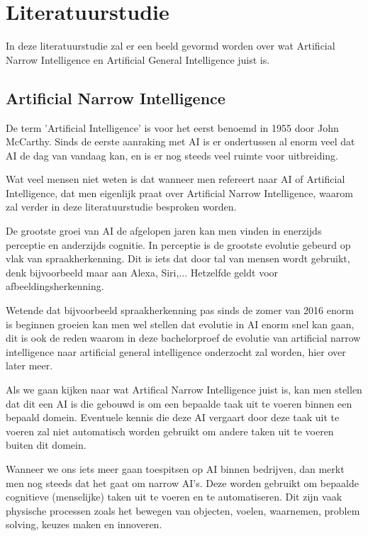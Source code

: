 \section{Literatuurstudie}
\label{sec:state-of-the-art}

In deze literatuurstudie zal er een beeld gevormd worden over wat Artificial Narrow Intelligence en Artificial General Intelligence juist is.

\subsection{Artificial Narrow Intelligence}

De term 'Artificial Intelligence' is voor het eerst benoemd in 1955 door John McCarthy. Sinds de eerste aanraking met AI is er ondertussen al enorm veel dat AI de dag van vandaag kan, en is er nog steeds veel ruimte voor uitbreiding.

Wat veel mensen niet weten is dat wanneer men refereert naar AI of Artificial Intelligence, dat men eigenlijk praat over Artificial Narrow Intelligence, waarom zal verder in deze literatuurstudie besproken worden. 

De grootste groei van AI de afgelopen jaren kan men vinden in enerzijds perceptie en anderzijds cognitie. In perceptie is de grootste evolutie gebeurd op vlak van spraakherkenning. Dit is iets dat door tal van mensen wordt gebruikt, denk bijvoorbeeld maar aan Alexa, Siri,... Hetzelfde geldt voor afbeeldingsherkenning.

Wetende dat bijvoorbeeld spraakherkenning pas sinds de zomer van 2016 enorm is beginnen groeien kan men wel stellen dat evolutie in AI enorm snel kan gaan, dit is ook de reden waarom in deze bachelorproef de evolutie van artificial narrow intelligence naar artificial general intelligence onderzocht zal worden, hier over later meer. \autocite{brynjolfsson2017artificial}

Als we gaan kijken naar wat Artifical Narrow Intelligence juist is, kan men stellen dat dit een AI is die gebouwd is om een bepaalde taak uit te voeren binnen een bepaald domein. Eventuele kennis die deze AI vergaart door deze taak uit te voeren zal niet automatisch worden gebruikt om andere taken uit te voeren buiten dit domein. 

Wanneer we ons iets meer gaan toespitsen op AI binnen bedrijven, dan merkt men nog steeds dat het gaat om narrow AI’s. Deze worden gebruikt om bepaalde cognitieve (menselijke) taken uit te voeren en te automatiseren. Dit zijn vaak physische processen zoals het bewegen van objecten, voelen, waarnemen, problem solving, keuzes maken en innoveren. 


